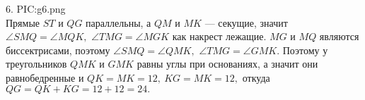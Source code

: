 6. {{PIC:g6.png}}\\
Прямые $ST$ и $QG$ параллельны, а $QM$ и $MK$ --- секущие, значит $\angle SMQ = \angle MQK,$  $\angle TMG= \angle MGK$ как накрест лежащие. $MG$ и $MQ$ являются биссектрисами, поэтому $\angle SMQ = \angle QMK,$ $ \angle TMG= \angle GMK.$ Поэтому у треугольников $QMK$ и $GMK$ равны углы при основаниях, а значит они равнобедренные и $QK=MK=12,\ KG=MK=12,$ откуда $QG=QK+KG=12+12=24.$\\
